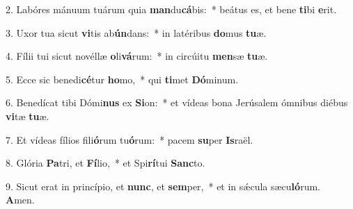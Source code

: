 2. Labóres mánuum tuárum quia \textbf{man}du\textbf{cá}bis:~*  beátus es, et bene \textbf{ti}bi \textbf{e}rit.\

3. Uxor tua sicut \textbf{vi}tis ab\textbf{ún}dans:~*  in latéribus \textbf{do}mus \textbf{tu}æ.\

4. Fílii tui sicut novéllæ \textbf{o}li\textbf{vá}rum:~*  in circúitu \textbf{men}sæ \textbf{tu}æ.\

5. Ecce sic benedi\textbf{cé}tur \textbf{ho}mo,~*  qui \textbf{ti}met \textbf{Dó}minum.\

6. Benedícat tibi Dómi\textbf{nus} ex \textbf{Si}on:~*  et vídeas bona Jerúsalem ómnibus diébus \textbf{vi}tæ \textbf{tu}æ.\

7. Et vídeas fílios fili\textbf{ó}rum tu\textbf{ó}rum:~*  pacem \textbf{su}per \textbf{Is}raël.\

8. Glória \textbf{Pa}tri, et \textbf{Fí}lio,~*  et Spi\textbf{rí}tui \textbf{Sanc}to.\

9. Sicut erat in princípio, et \textbf{nunc}, et \textbf{sem}per,~*  et in sǽcula sæcu\textbf{ló}rum. \textbf{A}men.\

